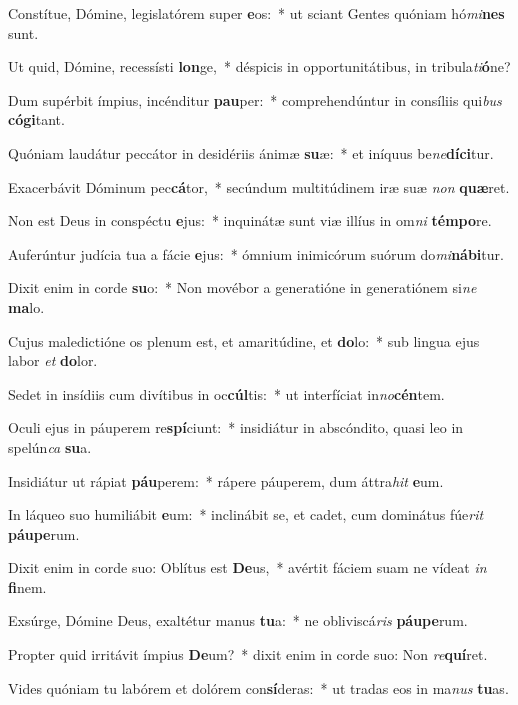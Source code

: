 \item Constítue, Dómine, legislatórem super \textbf{e}os:~* ut sciant Gentes quóniam hó\textit{mi}\textbf{nes} sunt.
\item Ut quid, Dómine, recessísti \textbf{lon}ge,~* déspicis in opportunitátibus, in tribula\textit{ti}\textbf{ó}ne?
\item Dum supérbit ímpius, incénditur \textbf{pau}per:~* comprehendúntur in consíliis qui\textit{bus} \textbf{có}\textbf{gi}tant.
\item Quóniam laudátur peccátor in desidériis ánimæ \textbf{su}æ:~* et iníquus be\textit{ne}\textbf{dí}\textbf{ci}tur.
\item Exacerbávit Dóminum pec\textbf{cá}tor,~* secúndum multitúdinem iræ suæ \textit{non} \textbf{quæ}ret.
\item Non est Deus in conspéctu \textbf{e}jus:~* inquinátæ sunt viæ illíus in om\textit{ni} \textbf{tém}\textbf{po}re.
\item Auferúntur judícia tua a fácie \textbf{e}jus:~* ómnium inimicórum suórum do\textit{mi}\textbf{ná}\textbf{bi}tur.
\item Dixit enim in corde \textbf{su}o:~* Non movébor a generatióne in generatiónem si\textit{ne} \textbf{ma}lo.
\item Cujus maledictióne os plenum est, et amaritúdine, et \textbf{do}lo:~* sub lingua ejus labor \textit{et} \textbf{do}lor.
\item Sedet in insídiis cum divítibus in oc\textbf{cúl}tis:~* ut interfíciat in\textit{no}\textbf{cén}tem.
\item Oculi ejus in páuperem re\textbf{spí}ciunt:~* insidiátur in abscóndito, quasi leo in spelún\textit{ca} \textbf{su}a.
\item Insidiátur ut rápiat \textbf{páu}perem:~* rápere páuperem, dum áttra\textit{hit} \textbf{e}um.
\item In láqueo suo humiliábit \textbf{e}um:~* inclinábit se, et cadet, cum dominátus fúe\textit{rit} \textbf{páu}\textbf{pe}rum.
\item Dixit enim in corde suo: Oblítus est \textbf{De}us,~* avértit fáciem suam ne vídeat \textit{in} \textbf{fi}nem.
\item Exsúrge, Dómine Deus, exaltétur manus \textbf{tu}a:~* ne obliviscá\textit{ris} \textbf{páu}\textbf{pe}rum.
\item Propter quid irritávit ímpius \textbf{De}um?~* dixit enim in corde suo: Non \textit{re}\textbf{quí}ret.
\item Vides quóniam tu labórem et dolórem con\textbf{sí}deras:~* ut tradas eos in ma\textit{nus} \textbf{tu}as.
